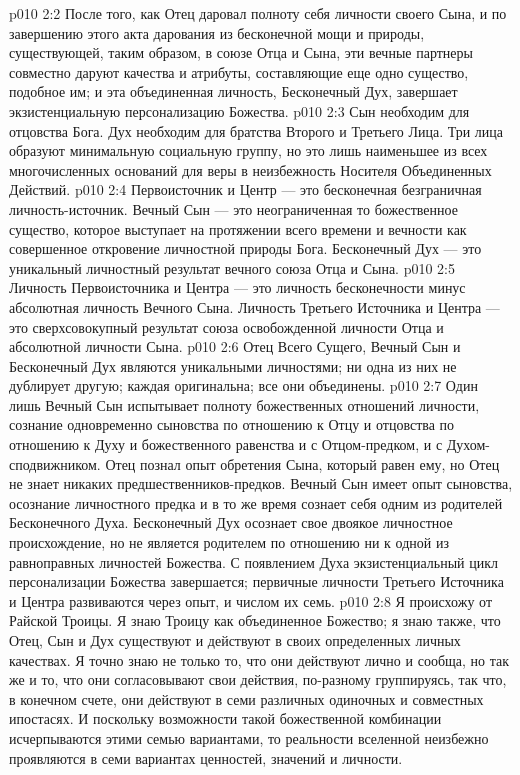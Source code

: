 \vs p010 2:2 После того, как Отец даровал полноту себя личности своего Сына, и по завершению этого акта дарования из бесконечной мощи и природы, существующей, таким образом, в союзе Отца и Сына, эти вечные партнеры совместно даруют качества и атрибуты, составляющие еще одно существо, подобное им; и эта объединенная личность, Бесконечный Дух, завершает экзистенциальную персонализацию Божества.
\vs p010 2:3 Сын необходим для отцовства Бога. Дух необходим для братства Второго и Третьего Лица. Три лица образуют минимальную социальную группу, но это лишь наименьшее из всех многочисленных оснований для веры в неизбежность Носителя Объединенных Действий.
\vs p010 2:4 \pc Первоисточник и Центр --- это бесконечная  безграничная личность\hyp{}источник. Вечный Сын --- это неограниченная  то божественное существо, которое выступает на протяжении всего времени и вечности как совершенное откровение личностной природы Бога. Бесконечный Дух --- это  уникальный личностный результат вечного союза Отца и Сына.
\vs p010 2:5 \pc Личность Первоисточника и Центра --- это личность бесконечности минус абсолютная личность Вечного Сына. Личность Третьего Источника и Центра --- это сверхсовокупный результат союза освобожденной личности Отца и абсолютной личности Сына.
\vs p010 2:6 \pc Отец Всего Сущего, Вечный Сын и Бесконечный Дух являются уникальными личностями; ни одна из них не дублирует другую; каждая оригинальна; все они объединены.
\vs p010 2:7 \pc Один лишь Вечный Сын испытывает полноту божественных отношений личности, сознание одновременно сыновства по отношению к Отцу и отцовства по отношению к Духу и божественного равенства и с Отцом\hyp{}предком, и с Духом\hyp{}сподвижником. Отец познал опыт обретения Сына, который равен ему, но Отец не знает никаких предшественников\hyp{}предков. Вечный Сын имеет опыт сыновства, осознание личностного предка и в то же время сознает себя одним из родителей Бесконечного Духа. Бесконечный Дух осознает свое двоякое личностное происхождение, но не является родителем по отношению ни к одной из равноправных личностей Божества. С появлением Духа экзистенциальный цикл персонализации Божества завершается; первичные личности Третьего Источника и Центра развиваются через опыт, и числом их семь.
\vs p010 2:8 Я происхожу от Райской Троицы. Я знаю Троицу как объединенное Божество; я знаю также, что Отец, Сын и Дух существуют и действуют в своих определенных личных качествах. Я точно знаю не только то, что они действуют лично и сообща, но так же и то, что они согласовывают свои действия, по\hyp{}разному группируясь, так что, в конечном счете, они действуют в семи различных одиночных и совместных ипостасях. И поскольку возможности такой божественной комбинации исчерпываются этими семью вариантами, то реальности вселенной неизбежно проявляются в семи вариантах ценностей, значений и личности.
